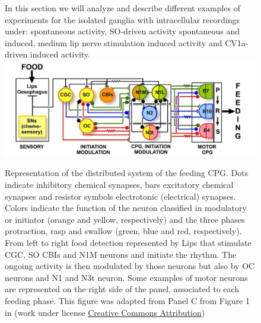 \begin{figure}[bth!]In this section we will analyze and describe different examples of experiments for the isolated ganglia with intracellular recordings under: spontaneous activity, SO-driven activity spontaneous and induced, medium lip nerve stimulation induced activity and CV1a-driven induced activity.
	\centering
	\includegraphics[width=\textwidth]{img/invariants/distributed_benjamin_2012.pdf}
	\caption{Representation of the distributed system of the feeding CPG. Dots indicate inhibitory chemical synapses, bars excitatory chemical synapses and resistor symbols electrotonic (electrical) synapses. Colors indicate the function of the neuron classified in modulatory or initiator (orange and yellow, respectively) and the three phases protraction, rasp and swallow (green, blue and red, respectively). From left to right food detection represented by Lips that stimulate CGC, SO CBIs and N1M neurons and initiate the rhythm. The ongoing activity is then modulated by those neurons but also by OC neurons and N1 and N3t neuron. Some examples of motor neurons are represented on the right side of the panel, associated to each feeding phase. This figure was adapted from Panel C from Figure 1 in \cite{benjamin_distributed_2012} (work under license \href{http://creativecommons.org/licenses/by/2.0}{Creative Commons Attribution})}
	\label{fig:feeding distribution}%
\end{figure}

